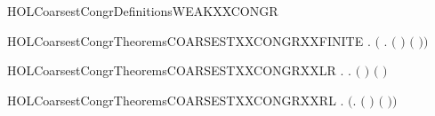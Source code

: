 \newcommand{\HOLCoarsestCongrDefinitionsSUMXXEQUIV}{\UseVerbatim{HOLCoarsestCongrDefinitionsSUMXXEQUIV}}
\begin{SaveVerbatim}{HOLCoarsestCongrDefinitionsWEAKXXCONGR}
\HOLTokenTurnstile{}  \HOLSymConst{\ensuremath{=}}  
\end{SaveVerbatim}
\newcommand{\HOLCoarsestCongrDefinitionsWEAKXXCONGR}{\UseVerbatim{HOLCoarsestCongrDefinitionsWEAKXXCONGR}}
\newcommand{\HOLCoarsestCongrDefinitions}{
\HOLDfnTag{CoarsestCongr}{free_action_def}\HOLCoarsestCongrDefinitionsfreeXXactionXXdef
\HOLDfnTag{CoarsestCongr}{KLOP_def}\HOLCoarsestCongrDefinitionsKLOPXXdef
\HOLDfnTag{CoarsestCongr}{KLOP_INF_def}\HOLCoarsestCongrDefinitionsKLOPXXINFXXdef
\HOLDfnTag{CoarsestCongr}{SUM_EQUIV}\HOLCoarsestCongrDefinitionsSUMXXEQUIV
\HOLDfnTag{CoarsestCongr}{WEAK_CONGR}\HOLCoarsestCongrDefinitionsWEAKXXCONGR
}
\begin{SaveVerbatim}{HOLCoarsestCongrTheoremsCOARSESTXXCONGRXXFINITE}
\HOLTokenTurnstile{} \HOLSymConst{\HOLTokenForall{}} .
         \HOLSymConst{\HOLTokenConj{}}   \HOLSymConst{\HOLTokenImp{}}
       \ensuremath{(}   \HOLSymConst{\HOLTokenEquiv{}} \HOLSymConst{\HOLTokenForall{}}.  \ensuremath{(} \HOLSymConst{\ensuremath{+}} \ensuremath{)} \ensuremath{(} \HOLSymConst{\ensuremath{+}} \ensuremath{)}\ensuremath{)}
\end{SaveVerbatim}
\newcommand{\HOLCoarsestCongrTheoremsCOARSESTXXCONGRXXFINITE}{\UseVerbatim{HOLCoarsestCongrTheoremsCOARSESTXXCONGRXXFINITE}}
\begin{SaveVerbatim}{HOLCoarsestCongrTheoremsCOARSESTXXCONGRXXLR}
\HOLTokenTurnstile{} \HOLSymConst{\HOLTokenForall{}} .    \HOLSymConst{\HOLTokenImp{}} \HOLSymConst{\HOLTokenForall{}}.  \ensuremath{(} \HOLSymConst{\ensuremath{+}} \ensuremath{)} \ensuremath{(} \HOLSymConst{\ensuremath{+}} \ensuremath{)}
\end{SaveVerbatim}
\newcommand{\HOLCoarsestCongrTheoremsCOARSESTXXCONGRXXLR}{\UseVerbatim{HOLCoarsestCongrTheoremsCOARSESTXXCONGRXXLR}}
\begin{SaveVerbatim}{HOLCoarsestCongrTheoremsCOARSESTXXCONGRXXRL}
\HOLTokenTurnstile{} \HOLSymConst{\HOLTokenForall{}} .
         \HOLSymConst{\HOLTokenConj{}}   \HOLSymConst{\HOLTokenImp{}}
       \ensuremath{(}\HOLSymConst{\HOLTokenForall{}}.  \ensuremath{(} \HOLSymConst{\ensuremath{+}} \ensuremath{)} \ensuremath{(} \HOLSymConst{\ensuremath{+}} \ensuremath{)}\ensuremath{)} \HOLSymConst{\HOLTokenImp{}}
         
\end{SaveVerbatim}
